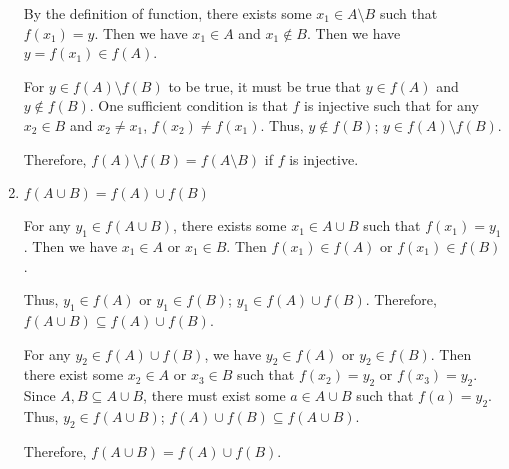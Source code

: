 \documentclass[12pt]{article}
\newcommand{\fxab}{
    f(A) \setminus f(B)
}
\newcommand{\faxb}{
    f(A \setminus B)
}
\newcommand{\fxstThree}{
\fxab = \faxb
}
\newcommand{\aub}{
A \cup B
}
\newcommand{\faub}{
    f(\aub)
}
\newcommand{\faufb}{
    f(A) \cup f(B)
}
\newcommand{\unionEq}{
    \faub = \faufb
}
\begin{document}
\begin{enumerate}
    By the definition of function, there exists some \(x_1 \in A \setminus B\) such that \(f(x_1)=y\).
    Then we have \(x_1 \in A\) and \(x_1 \notin B\). Then we have \(y= f(x_1) \in f(A)\).

    For \(y \in \fxab\) to be true, it must be true that \(y \in f(A)\) and \(y \notin f(B)\).
    One sufficient condition is that \(f\) is injective such that for any \(x_2 \in B\) and \(x_2 \neq x_1\), \(f(x_2) \neq f(x_1)\).
    Thus, \(y \notin f(B)\); \(y \in \fxab\).

    Therefore, \(\fxstThree\) if \(f\) is injective.

    \item \(\unionEq\)

    For any \(y_1 \in \faub\), there exists some \(x_1 \in \aub\) such that \(f(x_1) = y_1\).
    Then we have \(x_1 \in A\) or \(x_1 \in B\). Then \(f(x_1) \in f(A)\) or \(f(x_1) \in f(B)\).

    Thus, \(y_1 \in f(A)\) or \(y_1 \in f(B)\); \(y_1 \in \faufb\). Therefore, \(\faub \subseteq \faufb\).

    For any \(y_2 \in \faufb\), we have \(y_2 \in f(A)\) or \(y_2 \in f(B)\). Then there exist some
    \(x_2 \in A\) or \(x_3 \in B\) such that \(f(x_2)=y_2\) or \(f(x_3)=y_2\).
    Since \(A,B \subseteq \aub\), there must exist some \(a \in \aub\) such that \(f(a) =y_2\).
    Thus, \(y_2 \in \faub\); \(\faufb \subseteq \faub\).

    Therefore, \(\unionEq\).


\end{enumerate}
\end{document}
